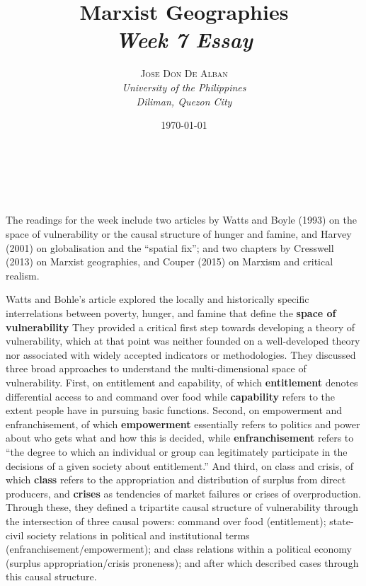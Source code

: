 \documentclass[a4paper, 10.5pt]{article} %
\title{\textbf{Marxist Geographies}\\ %
\textsl{Week 7 Essay}} %
\author{\textsc{Jose Don De Alban} %
\\{\textit{University of the Philippines} %
\\{\textit{Diliman, Quezon City}}}} %
\date{\today} %
\makeatletter
\renewcommand{\maketitle}
{
\begin{flushright} %
{\LARGE\@title} %
\vspace{40pt} %

{\large\@author} %
\\\@date %

\vspace{10pt} %
\end{flushright}
}
\makeatother
\begin{document}
\maketitle %


\section*{}

The readings for the week include two articles by Watts and Boyle (1993) \cite{watts_bohle_1993} on the space of vulnerability or the causal structure of hunger and famine, and Harvey (2001) \cite{harvey_2001} on globalisation and the \enquote{spatial fix}; and two chapters by Cresswell (2013) \cite{cresswell_2013} on Marxist geographies, and Couper (2015) \cite{couper_2015} on Marxism and critical realism.

Watts and Bohle's article explored the locally and historically specific interrelations between poverty, hunger, and famine that define the \textbf{space of vulnerability} They provided a critical first step towards developing a theory of vulnerability, which at that point was neither founded on a well-developed theory nor associated with widely accepted indicators or methodologies. They discussed three broad approaches to understand the multi-dimensional space of vulnerability. First, on entitlement and capability, of which \textbf{entitlement} denotes differential access to and command over food while \textbf{capability} refers to the extent people have in pursuing basic functions. Second, on empowerment and enfranchisement, of which \textbf{empowerment} essentially refers to politics and power about who gets what and how this is decided, while \textbf{enfranchisement} refers to \enquote{the degree to which an individual or group can legitimately participate in the decisions of a given society about entitlement.} And third, on class and crisis, of which \textbf{class} refers to the appropriation and distribution of surplus from direct producers, and \textbf{crises} as tendencies of market failures or crises of overproduction. Through these, they defined a tripartite causal structure of vulnerability through the intersection of three causal powers: command over food (entitlement); state-civil society relations in political and institutional terms (enfranchisement/empowerment); and class relations within a political economy (surplus appropriation/crisis proneness); and after which described cases through this causal structure.
\end{document}
